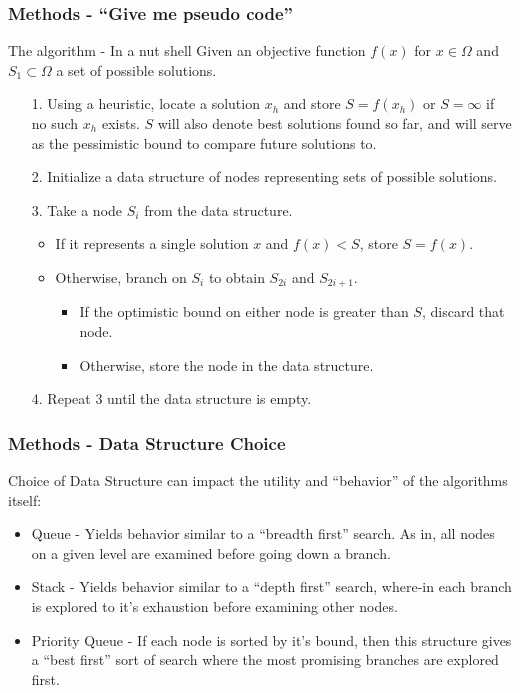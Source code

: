 \documentclass{beamer}
\begin{document}
\begin{frame}
\frametitle{Methods - ``Give me pseudo code''}
\begin{block}{The algorithm - In a nut shell}
Given an objective function $f(x)$ for $x \in \Omega$ and $S_1 \subset \Omega$ a set
of possible solutions. \\
\begin{itemize}
    \item[1.] Using a heuristic, locate a solution $x_h$ and store $S = f(x_h)$ or 
    $S= \infty$ if no such $x_h$ exists. $S$ will also denote best solutions found
    so far, and will serve as the pessimistic bound to compare future solutions to.
    \item[2.] Initialize a data structure of nodes representing sets of possible solutions.
    \item[3.] Take a node $S_i$ from the data structure.
    \begin{itemize}
        \item If it represents a single solution $x$
        and $f(x) < S$, store $S = f(x)$.
        \item Otherwise, branch on $S_i$ to obtain $S_{2i}$ and $S_{2i+1}$.
        \begin{itemize}
            \item If the optimistic bound on either node is greater than $S$, discard that node.
            \item Otherwise, store the node in the data structure.
        \end{itemize}
    \end{itemize}
    \item[4.] Repeat 3 until the data structure is empty.
\end{itemize}
\end{block}
\end{frame}

\begin{frame}
\frametitle{Methods - Data Structure Choice}
Choice of Data Structure can impact the utility and ``behavior'' of the algorithms itself:
\begin{itemize}
    \item Queue - Yields behavior similar to a ``breadth first'' search. As in, all nodes 
    on a given level are examined before going down a branch.
    \item Stack - Yields behavior similar to a ``depth first'' search, where-in each branch is 
    explored to it's exhaustion before examining other nodes.
    \item Priority Queue - If each node is sorted by it's bound, then this structure gives 
    a ``best first'' sort of search where the most promising branches are explored first.
\end{itemize}
\end{frame}
\end{document}
